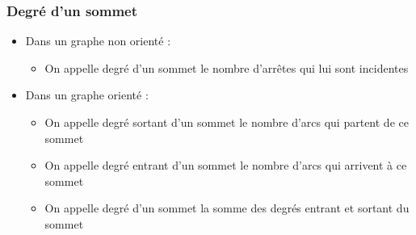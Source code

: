 \documentclass{beamer}
\let\oldsubsubsection\subsubsection
\renewcommand{\subsubsection}[2][]{\def\currentsubsubsection{#2}\oldsubsubsection[#1]{#2}}
\begin{document}
\subsubsection{Degré d'un sommet}
\begin{frame}
    \begin{itemize}
        \item Dans un graphe non orienté :
        \begin{itemize}
            \item On appelle degré d'un sommet le nombre d'arrêtes qui lui sont incidentes
        \end{itemize}
        \item Dans un graphe orienté :
        \begin{itemize}
            \item On appelle degré sortant d'un sommet le nombre d'arcs qui partent de ce sommet
            \item On appelle degré entrant d'un sommet le nombre d'arcs qui arrivent à ce sommet
            \item On appelle degré d'un sommet la somme des degrés entrant et sortant du sommet
        \end{itemize}
    \end{itemize}
\end{frame}
\end{document}
